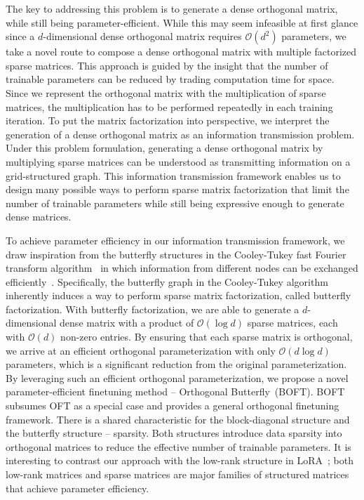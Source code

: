 \vspace{-0.6mm}

The key to addressing this problem is to generate a dense orthogonal matrix, while still being parameter-efficient. While this may seem infeasible at first glance since a $d$-dimensional dense orthogonal matrix requires $\mathcal{O}(d^2)$ parameters, we take a novel route to compose a dense orthogonal matrix with multiple factorized sparse matrices. This approach is guided by the insight that the number of trainable parameters can be reduced by trading computation time for space. Since we represent the orthogonal matrix with the multiplication of sparse matrices, the multiplication has to be performed repeatedly in each training iteration. To put the matrix factorization into perspective, we interpret the generation of a dense orthogonal matrix as an information transmission problem. Under this problem formulation, generating a dense orthogonal matrix by multiplying sparse matrices can be understood as transmitting information on a grid-structured graph. This information transmission framework enables us to design many possible ways to perform sparse matrix factorization that limit the number of trainable parameters while still being expressive enough to generate dense matrices.

\vspace{-0.6mm}

To achieve parameter efficiency in our information transmission framework, we draw inspiration from the butterfly structures in the Cooley-Tukey fast Fourier transform algorithm~\cite{cooley1965algorithm} in which information from different nodes can be exchanged efficiently~\cite{klasing1994broadcasting}. Specifically, the butterfly graph in the Cooley-Tukey algorithm inherently induces a way to perform sparse matrix factorization, called butterfly factorization. With butterfly factorization, we are able to generate a $d$-dimensional dense matrix with a product of $\mathcal{O}(\log d)$ sparse matrices, each with $\mathcal{O}(d)$ non-zero entries. By ensuring that each sparse matrix is orthogonal, we arrive at an efficient orthogonal parameterization with only $\mathcal{O}(d\log d)$  parameters, which is a significant reduction from the original parameterization. By leveraging such an efficient orthogonal parameterization, we propose a novel parameter-efficient finetuning method -- Orthogonal Butterfly~(BOFT). BOFT subsumes OFT as a special case and provides a general orthogonal finetuning framework. There is a shared characteristic for the block-diagonal structure and the butterfly structure -- sparsity. Both structures introduce data sparsity into orthogonal matrices to reduce the effective number of trainable parameters.  It is interesting to   contrast our approach with the low-rank structure in LoRA~\cite{hulora2022};  both low-rank matrices and sparse matrices are major families of structured matrices~\cite{candes2011robust} that achieve parameter efficiency. 

